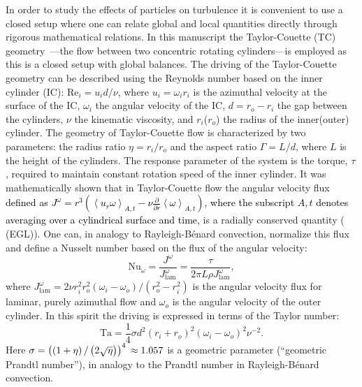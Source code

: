 \documentclass{jfm}
\newcommand\Nus{\text{Nu}}
\newcommand\Tay{\text{Ta}}
\newcommand\rey{\text{Re}}
\newcommand{\red}[1]{\textcolor{black}{#1}}
\begin{document}
In order to study the effects of particles on turbulence it is convenient to
use a closed setup where one can relate global and local quantities directly
through rigorous mathematical relations. In this manuscript the Taylor-Couette
(TC) geometry~\citep{Grossmann2016}---the flow between two concentric rotating
cylinders---is employed as this is a closed setup with global balances. The
driving of the Taylor-Couette geometry can be described using the Reynolds
number based on the inner cylinder (IC): $\rey_i = u_i d / \nu$, where $u_i =
\omega_i r_i$ is the azimuthal velocity at the surface of the IC, $\omega_i$
the angular velocity of the IC, $d = r_o - r_i$ the gap between the cylinders,
$\nu$ the kinematic viscosity, and $r_i$($r_o$) the radius of the inner(outer)
cylinder. The geometry of Taylor-Couette flow is characterized by two
parameters: the radius ratio $\eta=r_i/r_o$ and the aspect ratio $\Gamma =
L/d$, where $L$ is the height of the cylinders. The response parameter of the
system is the torque, $\tau$, required to maintain constant rotation speed of
the inner cylinder. It was mathematically shown that in Taylor-Couette flow
the angular velocity flux \red{defined as $J^\omega = r^3 \left(  \left
\langle u_r \omega \right \rangle_{A,t} - \nu \frac{\partial} {\partial r}
\left \langle \omega \right \rangle_{A,t} \right)$, where the subscript $A,t$
denotes averaging over a cylindrical surface and time,	} is a radially
conserved quantity (\cite*{Eckhardt2007} (EGL)). One can, in analogy to
Rayleigh-B\'enard convection, normalize this flux and define a Nusselt number
based on the flux of the angular velocity:
\begin{equation}
  \Nus_\omega = \frac{J^\omega}{J^\omega_{\text{lam}}} = \frac{\tau}{2 \pi L \rho J^\omega_{\text{lam}}},
\end{equation}
where $J^\omega_{\text{lam}} = 2 \nu r^2_i r^2_o \left( \omega_i - \omega_o
\right)/\left( r^2_o - r^2_i \right)$ is the angular velocity flux for
laminar, purely azimuthal flow and $\omega_o$ is the angular velocity of the
outer cylinder. In this spirit the driving is expressed in terms of the Taylor
number:
\begin{equation}
  \Tay = \frac{1}{4} \sigma d^2 \left(r_i + r_o \right)^2 \left( \omega_i - \omega_o \right)^2 \nu^{-2}.
\end{equation}
Here $\sigma = \left( \left( 1 + \eta \right) / \left(2 \sqrt{\eta} \right)
\right)^4\;\red{\approx}\;1.057$ is a geometric parameter (``geometric Prandtl
number''), in analogy to the Prandtl number in Rayleigh-B\'enard convection.
\end{document}
